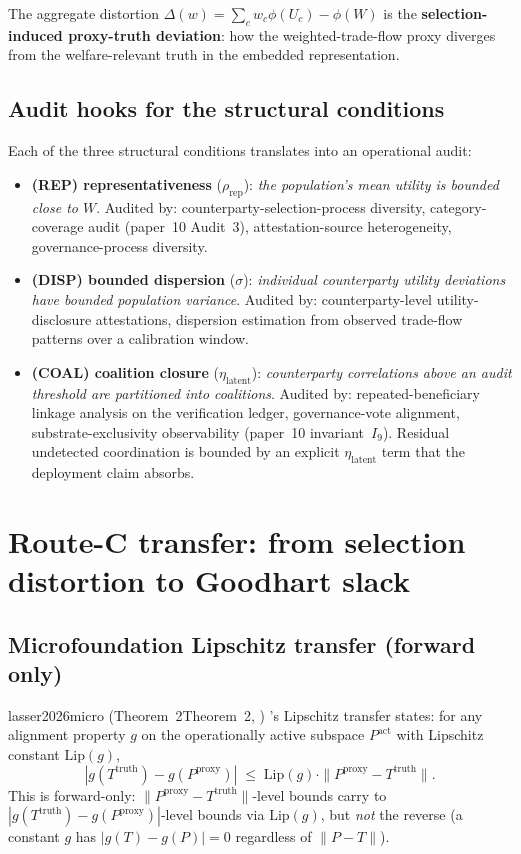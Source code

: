 \documentclass{article}
\makeatletter
\newcommand{\citep}[2][]{%
  \begingroup
  \def\@tmpkey{#2}%
  \ifx\@tmpkey\@empty\else
    (\ifx\@empty#1\@empty\else #1, \fi
     \@nameuse{bibkey@\@tmpkey})%
  \fi
  \endgroup
}
\newcommand{\Pproxy}{P^{\mathrm{proxy}}}
\newcommand{\Ttruth}{T^{\mathrm{truth}}}
\newcommand{\Lip}{\mathrm{Lip}}
\makeatother
\begin{document}
The aggregate distortion $\Delta(w) = \sum_c w_c \phi(U_c) -
\phi(W)$ is the \textbf{selection-induced proxy-truth deviation}:
how the weighted-trade-flow proxy diverges from the
welfare-relevant truth in the embedded representation.

\subsection{Audit hooks for the structural conditions}

Each of the three structural conditions translates into an
operational audit:

\begin{itemize}
\item \textbf{(REP) representativeness} ($\rho_\mathrm{rep}$):
  \emph{the population's mean utility is bounded close to $W$}.
  Audited by: counterparty-selection-process diversity,
  category-coverage audit (paper~10 Audit~3), attestation-source
  heterogeneity, governance-process diversity.

\item \textbf{(DISP) bounded dispersion} ($\sigma$):
  \emph{individual counterparty utility deviations have bounded
  population variance}.  Audited by: counterparty-level
  utility-disclosure attestations, dispersion estimation from
  observed trade-flow patterns over a calibration window.

\item \textbf{(COAL) coalition closure} ($\eta_\mathrm{latent}$):
  \emph{counterparty correlations above an audit threshold are
  partitioned into coalitions}.  Audited by:
  repeated-beneficiary linkage analysis on the verification
  ledger, governance-vote alignment, substrate-exclusivity
  observability (paper~10 invariant~$I_9$).  Residual undetected
  coordination is bounded by an explicit $\eta_\mathrm{latent}$
  term that the deployment claim absorbs.
\end{itemize}

\section{Route-C transfer: from selection distortion to Goodhart slack}

\subsection{Microfoundation Lipschitz transfer (forward only)}

\citep[Theorem~2]{lasser2026micro}'s Lipschitz transfer states: for
any alignment property $g$ on the operationally active subspace
$P^\mathrm{act}$ with Lipschitz constant $\Lip(g)$,
\begin{equation}
\label{eq:lip-transfer-v2}
  |g(\Ttruth) - g(\Pproxy)| \;\leq\; \Lip(g) \cdot
  \|\Pproxy - \Ttruth\|.
\end{equation}
This is forward-only: $\|\Pproxy - \Ttruth\|$-level bounds carry
to $|g(\Ttruth) - g(\Pproxy)|$-level bounds via $\Lip(g)$, but
\emph{not} the reverse (a constant $g$ has $|g(T) - g(P)| = 0$
regardless of $\|P - T\|$).
\end{document}
